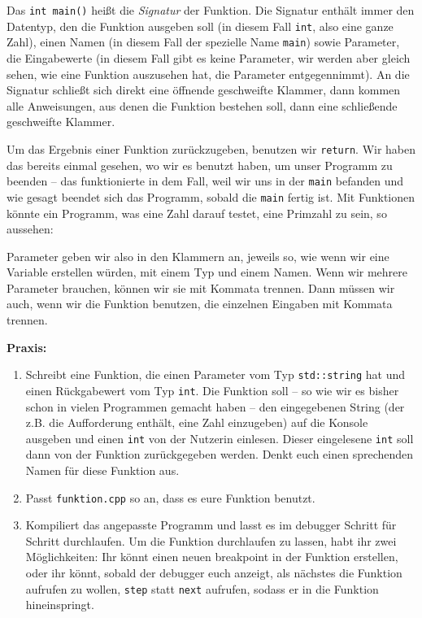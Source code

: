 Das \texttt{int main()} heißt die \emph{Signatur} der Funktion. Die Signatur
enthält immer den Datentyp, den die Funktion ausgeben soll (in diesem Fall
\texttt{int}, also eine ganze Zahl), einen Namen (in diesem Fall der spezielle
Name \texttt{main}) sowie Parameter, die Eingabewerte (in diesem Fall gibt es
keine Parameter, wir werden aber gleich sehen, wie eine Funktion auszusehen
hat, die Parameter entgegennimmt). An die Signatur schließt sich direkt eine
öffnende geschweifte Klammer, dann kommen alle Anweisungen, aus denen die
Funktion bestehen soll, dann eine schließende geschweifte Klammer.

Um das Ergebnis einer Funktion zurückzugeben, benutzen wir \texttt{return}. Wir
haben das bereits einmal gesehen, wo wir es benutzt haben, um unser Programm zu
beenden -- das funktionierte in dem Fall, weil wir uns in der \texttt{main}
befanden und wie gesagt beendet sich das Programm, sobald die \texttt{main}
fertig ist. Mit Funktionen könnte ein Programm, was eine Zahl darauf testet,
eine Primzahl zu sein, so aussehen:

Parameter geben wir also in den Klammern an, jeweils so, wie wenn wir eine
Variable erstellen würden, mit einem Typ und einem Namen. Wenn wir mehrere
Parameter brauchen, können wir sie mit Kommata trennen. Dann müssen wir auch,
wenn wir die Funktion benutzen, die einzelnen Eingaben mit Kommata trennen.

\textbf{Praxis:}
\begin{enumerate}
    \item Schreibt eine Funktion, die einen Parameter vom Typ
        \texttt{std::string} hat und einen Rückgabewert vom Typ \texttt{int}.
        Die Funktion soll -- so wie wir es bisher schon in vielen Programmen
        gemacht haben -- den eingegebenen String (der z.B. die Aufforderung
        enthält, eine Zahl einzugeben) auf die Konsole ausgeben und einen
        \texttt{int} von der Nutzerin einlesen. Dieser eingelesene \texttt{int}
        soll dann von der Funktion zurückgegeben werden.
        Denkt euch einen sprechenden Namen für diese Funktion aus.
    \item Passt \texttt{funktion.cpp} so an, dass es eure Funktion benutzt.
    \item Kompiliert das angepasste Programm und lasst es im debugger Schritt
        für Schritt durchlaufen. Um die Funktion durchlaufen zu lassen, habt
        ihr zwei Möglichkeiten: Ihr könnt einen neuen breakpoint in der
        Funktion erstellen, oder ihr könnt, sobald der debugger euch anzeigt,
        als nächstes die Funktion aufrufen zu wollen, \texttt{step} statt
        \texttt{next} aufrufen, sodass er in die Funktion hineinspringt.
\end{enumerate}

